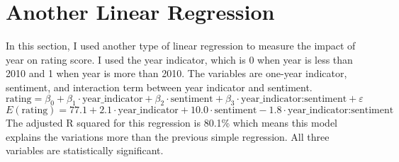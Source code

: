 \documentclass{article}
\begin{document}
\section{Another Linear Regression}
In this section, I used another type of linear regression to measure the impact of year on rating score. I used the year indicator, which is 0 when year is less than 2010 and 1 when year is more than 2010. The variables are one-year indicator, sentiment, and interaction term between year indicator and sentiment. 
$$\text{rating} = \beta_0 + \beta_1 \cdot \text{year\_indicator} + \beta_2 \cdot \text{sentiment} + \beta_3 \cdot \text{year\_indicator:sentiment} + \varepsilon$$
$$E(\text{rating}) = 77.1 + 2.1 \cdot \text{year\_indicator} + 10.0 \cdot \text{sentiment} - 1.8 \cdot \text{year\_indicator:sentiment}$$
The adjusted R squared for this regression is 80.1\% which means this model explains the variations more than the previous simple regression. All three variables are statistically significant. 
\end{document}
